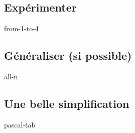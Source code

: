 \subsection{Expérimenter}

{from-1-to-4}



\subsection{Généraliser (si possible)}

{all-n}



\subsection{Une belle simplification}

{pascal-tab}